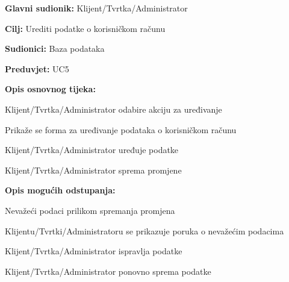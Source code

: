 \noindent {}
\begin{packed_item}
	
	\item \textbf{Glavni sudionik:} Klijent/Tvrtka/Administrator
	\item  \textbf{Cilj:} Urediti podatke o korisničkom računu
	\item  \textbf{Sudionici:} Baza podataka
	\item  \textbf{Preduvjet:} UC5
	\item  \textbf{Opis osnovnog tijeka:}
	
	\item[] \begin{packed_enum}
		
		\item Klijent/Tvrtka/Administrator odabire akciju za uređivanje
		\item Prikaže se forma za uređivanje podataka o korisničkom računu
		\item Klijent/Tvrtka/Administrator uređuje podatke
		\item Klijent/Tvrtka/Administrator sprema promjene
	
	\end{packed_enum}
	
	\item  \textbf{Opis mogućih odstupanja:}
	
	\item[] \begin{packed_item}
		
		\item[3.a] Nevažeći podaci prilikom spremanja promjena
		\item[] \begin{packed_enum}
			
			\item Klijentu/Tvrtki/Administratoru se prikazuje poruka o nevažećim podacima
			\item Klijent/Tvrtka/Administrator ispravlja podatke
			\item Klijent/Tvrtka/Administrator ponovno sprema podatke
			
		\end{packed_enum}
		
	\end{packed_item}
\end{packed_item}


